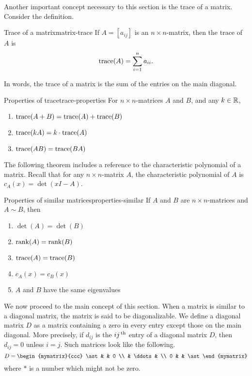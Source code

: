 Another important concept necessary to this section is the trace of a matrix. Consider the definition.

\begin{definition}{Trace of a matrix}{matrix-trace}
%
If $A=[a_{ij}]$ is an $n\times n$-matrix, then the
trace of $A$ is
\[ \mbox{\rm trace}(A) = \sum_{i=1}^n a_{ii}.\]
\end{definition}

In words, the trace of a matrix is the sum of the entries on the main diagonal. 

\begin{lemma}{Properties of trace}{trace-properties}
For $n\times n$-matrices $A$ and $B$, and any $k\in\mathbb{R}$,
\begin{enumerate}
\item $\mbox{\rm trace}(A+B)=\mbox{\rm trace}(A) + \mbox{\rm trace}(B)$
\item $\mbox{\rm trace}(kA)=k\cdot\mbox{\rm trace}(A)$
\item $\mbox{\rm trace}(AB)=\mbox{\rm trace}(BA)$
\end{enumerate}
\end{lemma}

The following theorem includes a reference to the characteristic polynomial of a matrix. Recall that for any $n \times n$-matrix $A$, the characteristic polynomial of $A$ is $c_A(x)=\det(xI-A)$.

\begin{theorem}{Properties of similar matrices}{properties-similar}
If $A$ and $B$ are $n\times n$-matrices and $A\sim B$, then
\begin{enumerate}
\item $\det(A) = \det(B)$
\item $\rank(A) = \rank(B)$
\item $\mbox{\rm trace}(A)= \mbox{\rm trace}(B)$
\item $c_A(x)=c_B(x)$
\item $A$ and $B$ have the same eigenvalues
\end{enumerate}
\end{theorem}

We now proceed to the main concept of this section. When a matrix is similar to a diagonal matrix, the matrix is said to
be
diagonalizable. 
We define a diagonal matrix $D$ as a matrix containing a zero in every entry 
except those on the main diagonal. More precisely, if $d_{ij}$ is the $ij^{\,\rm th}$ entry of a diagonal matrix $D$, then
$d_{ij}=0$ unless $i=j$. Such
matrices look like the following.
\begin{equation*}
D = \begin{mymatrix}{ccc}
\ast &  & 0 \\
& \ddots &  \\
0 &  & \ast
\end{mymatrix}
\end{equation*}
where $\ast $ is a number which might not be zero.

